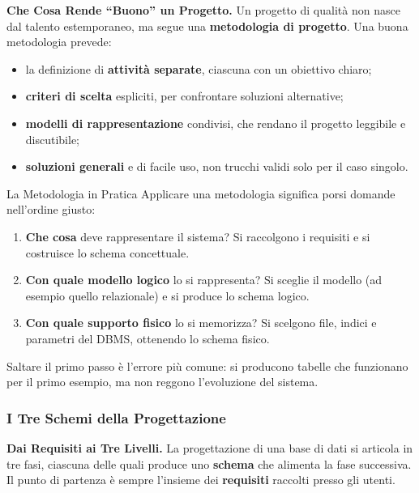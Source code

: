 \documentclass[12pt]{extarticle}
\begin{document}
\medskip
\noindent \textbf{Che Cosa Rende ``Buono'' un Progetto.} Un progetto di qualità non nasce dal talento estemporaneo, ma segue una \textbf{metodologia di progetto}. Una buona metodologia prevede:
\begin{itemize}
    \item la definizione di \textbf{attività separate}, ciascuna con un obiettivo chiaro;
    \item \textbf{criteri di scelta} espliciti, per confrontare soluzioni alternative;
    \item \textbf{modelli di rappresentazione} condivisi, che rendano il progetto leggibile e discutibile;
    \item \textbf{soluzioni generali} e di facile uso, non trucchi validi solo per il caso singolo.
\end{itemize}

\begin{cbox}{La Metodologia in Pratica}
\noindent Applicare una metodologia significa porsi domande nell'ordine giusto:
\begin{enumerate}
    \item \textbf{Che cosa} deve rappresentare il sistema? Si raccolgono i requisiti e si costruisce lo schema concettuale.
    \item \textbf{Con quale modello logico} lo si rappresenta? Si sceglie il modello (ad esempio quello relazionale) e si produce lo schema logico.
    \item \textbf{Con quale supporto fisico} lo si memorizza? Si scelgono file, indici e parametri del DBMS, ottenendo lo schema fisico.
\end{enumerate}
Saltare il primo passo è l'errore più comune: si producono tabelle che funzionano per il primo esempio, ma non reggono l'evoluzione del sistema.
\end{cbox}

\subsubsection{I Tre Schemi della Progettazione}

\noindent \textbf{Dai Requisiti ai Tre Livelli.} La progettazione di una base di dati si articola in tre fasi, ciascuna delle quali produce uno \textbf{schema} che alimenta la fase successiva. Il punto di partenza è sempre l'insieme dei \textbf{requisiti} raccolti presso gli utenti.
\end{document}
